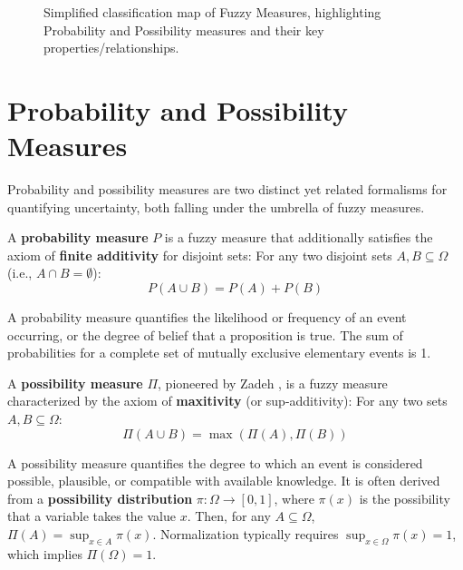 \begin{figure}[h!]
{%
}
\caption{Simplified classification map of Fuzzy Measures, highlighting Probability and Possibility measures and their key properties/relationships.}
\label{fig:fuzzy_classification}
\end{figure}

\section{Probability and Possibility Measures}
Probability and possibility measures are two distinct yet related formalisms for quantifying uncertainty, both falling under the umbrella of fuzzy measures.

\begin{definition}
A \textbf{probability measure} $P$ is a fuzzy measure that additionally satisfies the axiom of \textbf{finite additivity} for disjoint sets:
For any two disjoint sets $A, B \subseteq \Omega$ (i.e., $A \cap B = \emptyset$):
\[ P(A \cup B) = P(A) + P(B) \]
\end{definition}
A probability measure quantifies the likelihood or frequency of an event occurring, or the degree of belief that a proposition is true. The sum of probabilities for a complete set of mutually exclusive elementary events is 1.

\begin{definition}
A \textbf{possibility measure} $\Pi$, pioneered by Zadeh \cite{Zadeh1978}, is a fuzzy measure characterized by the axiom of \textbf{maxitivity} (or sup-additivity):
For any two sets $A, B \subseteq \Omega$:
\[ \Pi(A \cup B) = \max(\Pi(A), \Pi(B)) \]
\end{definition}
A possibility measure quantifies the degree to which an event is considered possible, plausible, or compatible with available knowledge. It is often derived from a \textbf{possibility distribution} $\pi: \Omega \to [0, 1]$, where $\pi(x)$ is the possibility that a variable takes the value $x$. Then, for any $A \subseteq \Omega$, $\Pi(A) = \sup_{x \in A} \pi(x)$. Normalization typically requires $\sup_{x \in \Omega} \pi(x) = 1$, which implies $\Pi(\Omega) = 1$.

